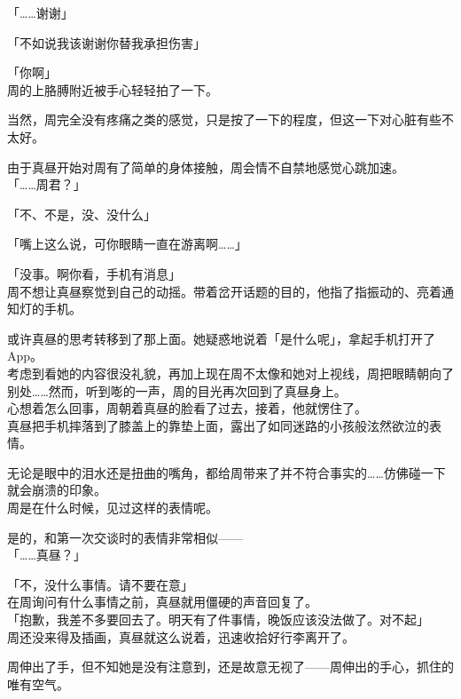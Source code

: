 「……谢谢」

「不如说我该谢谢你替我承担伤害」

「你啊」\\

周的上胳膊附近被手心轻轻拍了一下。

当然，周完全没有疼痛之类的感觉，只是按了一下的程度，但这一下对心脏有些不太好。

由于真昼开始对周有了简单的身体接触，周会情不自禁地感觉心跳加速。\\

「……周君？」

「不、不是，没、没什么」

「嘴上这么说，可你眼睛一直在游离啊……」

「没事。啊你看，手机有消息」\\

周不想让真昼察觉到自己的动摇。带着岔开话题的目的，他指了指振动的、亮着通知灯的手机。

或许真昼的思考转移到了那上面。她疑惑地说着「是什么呢」，拿起手机打开了App。\\

考虑到看她的内容很没礼貌，再加上现在周不太像和她对上视线，周把眼睛朝向了别处……然而，听到嘭的一声，周的目光再次回到了真昼身上。\\

心想着怎么回事，周朝着真昼的脸看了过去，接着，他就愣住了。\\

真昼把手机摔落到了膝盖上的靠垫上面，露出了如同迷路的小孩般泫然欲泣的表情。

无论是眼中的泪水还是扭曲的嘴角，都给周带来了并不符合事实的……仿佛碰一下就会崩溃的印象。\\

周是在什么时候，见过这样的表情呢。

是的，和第一次交谈时的表情非常相似——\\

「……真昼？」

「不，没什么事情。请不要在意」\\

在周询问有什么事情之前，真昼就用僵硬的声音回复了。\\

「抱歉，我差不多要回去了。明天有了件事情，晚饭应该没法做了。对不起」\\

周还没来得及插画，真昼就这么说着，迅速收拾好行李离开了。

周伸出了手，但不知她是没有注意到，还是故意无视了——周伸出的手心，抓住的唯有空气。\\

